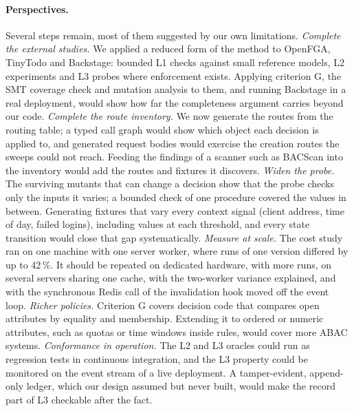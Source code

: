 \documentclass[sigconf,review,anonymous]{acmart}
\begin{document}
\paragraph{Perspectives.} Several steps remain, most of them suggested by our own limitations.
\emph{Complete the external studies.} We applied a reduced form of the method to OpenFGA, TinyTodo and
Backstage: bounded L1 checks against small reference models, L2 experiments and L3 probes where enforcement
exists. Applying criterion G, the SMT coverage check and mutation analysis to them, and running Backstage in a
real deployment, would show how far the completeness argument carries beyond our code.
\emph{Complete the route inventory.} We now generate the routes from the routing table; a typed call graph
would show which object each decision is applied to, and generated request bodies would exercise the creation
routes the sweeps could not reach. Feeding the findings of a scanner such as BACScan \cite{liu2025bacscan} into the
inventory would add the routes and fixtures it discovers.
\emph{Widen the probe.} The surviving mutants that can change a decision show that the probe checks only the
inputs it varies; a bounded check of one procedure covered the values in between. Generating fixtures that vary
every context signal (client address, time of day, failed logins), including values at each threshold, and every
state transition would close that gap systematically.
\emph{Measure at scale.} The cost study ran on one machine with one server worker, where runs of one version
differed by up to 42\,\%. It should be repeated on dedicated hardware, with more runs, on several servers sharing
one cache, with the two-worker variance explained, and with the synchronous Redis call of the invalidation hook
moved off the event loop.
\emph{Richer policies.} Criterion G covers decision code that compares open attributes by equality and
membership. Extending it to ordered or numeric attributes, such as quotas or time windows inside rules, would
cover more ABAC systems.
\emph{Conformance in operation.} The L2 and L3 oracles could run as regression tests in continuous
integration, and the L3 property could be monitored on the event stream of a live deployment. A tamper-evident,
append-only ledger, which our design assumed but never built, would make the record part of L3 checkable after
the fact.

\end{document}
